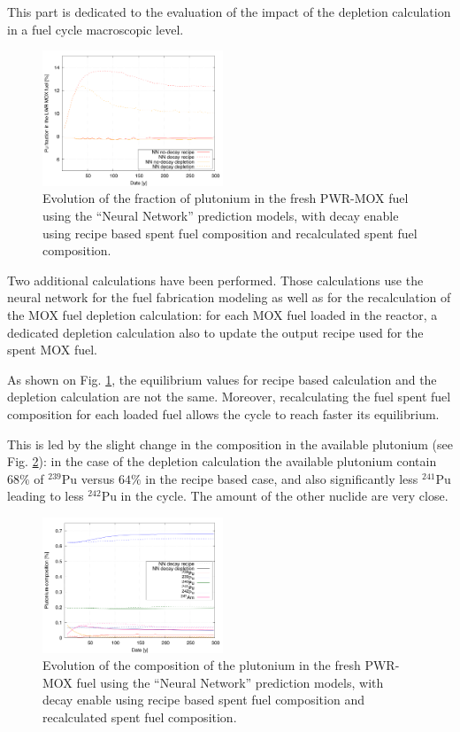 \documentclass{anstrans}
\begin{document}
This part is dedicated to the evaluation of the impact of the depletion
calculation in a fuel cycle macroscopic level.

\begin{figure}[ht] %
  \centering
  \includegraphics[width=0.48\textwidth]{irradiation_pu_contribution.png}
  \caption{Evolution of the fraction of plutonium in the fresh PWR-MOX fuel
  using the ``Neural Network'' prediction models, with decay enable using recipe
based spent fuel composition and recalculated spent fuel composition.}
  \label{fig:depletion}
\end{figure}

Two additional calculations have been performed. Those calculations use the
neural network for the fuel fabrication modeling as well as for the
recalculation of the MOX fuel depletion calculation: for each MOX fuel loaded in
the reactor, a dedicated depletion calculation also to update the output recipe
used for the spent MOX fuel.


As shown on Fig. \ref{fig:depletion}, the equilibrium values for recipe based
calculation and the depletion calculation are not the same. Moreover,
recalculating the fuel spent fuel composition for each loaded fuel allows the
cycle to reach faster its equilibrium. 

This is led by the slight change in the composition in the available plutonium
(see Fig. \ref{fig:depletioncompo}): in the case of the depletion calculation
the available plutonium contain $68\%$ of $^{239}$Pu versus $64\%$ in the recipe
based case, and also significantly less $^{241}$Pu leading to less $^{242}$Pu in
the cycle. The amount of the other nuclide are very close.

\begin{figure}[ht] %
  \centering
  \includegraphics[width=0.48\textwidth]{MOX_pu_composition.png}
  \caption{Evolution of the composition of the plutonium in the fresh PWR-MOX fuel
  using the ``Neural Network'' prediction models, with decay enable using recipe
based spent fuel composition and recalculated spent fuel composition.}
  \label{fig:depletioncompo}
\end{figure}
\end{document}
